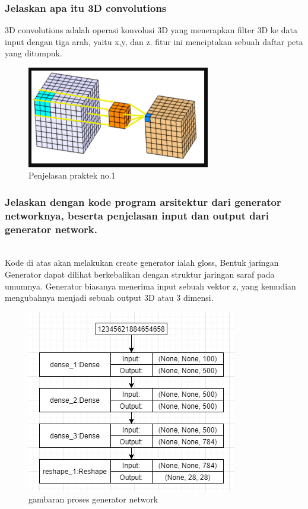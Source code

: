 \subsubsection{Jelaskan apa itu 3D convolutions}
\hfill\break
3D convolutions adalah operasi konvolusi 3D yang menerapkan filter 3D ke data input dengan tiga arah, yaitu x,y, dan z. fitur ini menciptakan sebuah daftar peta yang ditumpuk. 
\begin{figure}[H]
	\centering
	\includegraphics[width=8cm]{figures/1174067/8/no1.png}
	\caption{Penjelasan praktek no.1}
\end{figure}

\subsubsection{Jelaskan dengan kode program arsitektur dari generator networknya, beserta penjelasan input dan output dari generator network.}
\hfill\\

Kode di atas akan melakukan create generator ialah gloss, Bentuk jaringan Generator dapat dilihat berkebalikan dengan struktur jaringan saraf pada umumnya. Generator biasanya menerima input sebuah vektor z, yang kemudian mengubahnya menjadi sebuah output 3D atau 3 dimensi.
\begin{figure}[H]
	\centering
	\includegraphics[scale=0.5]{figures/1174067/8/3a.jpg}
	\caption{gambaran proses generator network}
\end{figure}

